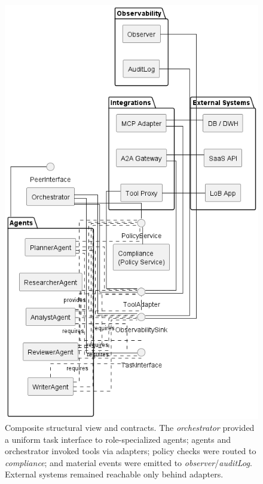 \begin{figure}[t]
  \centering
  \includegraphics[width=0.5\linewidth]{ressources/MAS/figures/5_2_struct_overview.png}
  \caption{Composite structural view and contracts. The \emph{orchestrator} provided a uniform task interface to role-specialized agents; agents and orchestrator invoked tools via adapters; policy checks were routed to \emph{compliance}; and material events were emitted to \emph{observer}/\emph{auditLog}. External systems remained reachable only behind adapters.}
  \label{fig:5.2-struct-overview}
\end{figure}

